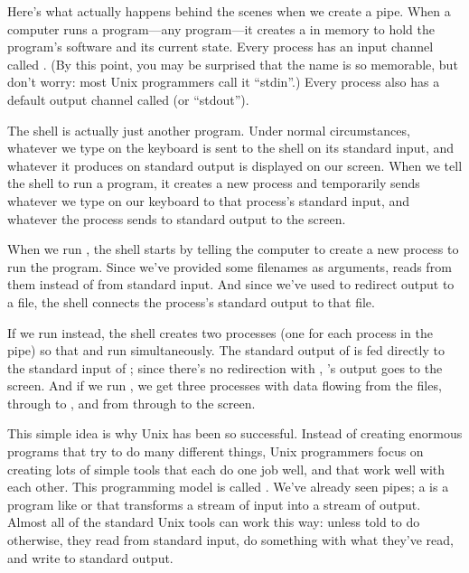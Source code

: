 Here's what actually happens behind the scenes when we create a pipe.
When a computer runs a program---any program---it creates a
 in memory to hold the program's software
and its current state. Every process has an input channel called
. (By this point, you may be
surprised that the name is so memorable, but don't worry: most Unix
programmers call it ``stdin''.) Every process also has a default output
channel called  (or
``stdout'').

The shell is actually just another program. Under normal circumstances,
whatever we type on the keyboard is sent to the shell on its standard
input, and whatever it produces on standard output is displayed on our
screen. When we tell the shell to run a program, it creates a new
process and temporarily sends whatever we type on our keyboard to that
process's standard input, and whatever the process sends to standard
output to the screen.

When we run
, the shell starts by telling
the computer to create a new process to run the  program.
Since we've provided some filenames as arguments,  reads
from them instead of from standard input. And since we've used
\code{\textgreater{}} to redirect output to a file, the shell connects
the process's standard output to that file.

If we run  instead, the shell
creates two processes (one for each process in the pipe) so that
 and  run simultaneously. The standard output of
 is fed directly to the standard input of ;
since there's no redirection with \code{\textgreater{}},
's output goes to the screen. And if we run
, we get three
processes with data flowing from the files, through  to
, and from  through  to the
screen.

This simple idea is why Unix has been so successful. Instead of creating
enormous programs that try to do many different things, Unix programmers
focus on creating lots of simple tools that each do one job well, and
that work well with each other. This programming model is called
. We've already seen
pipes; a  is a program like  or
 that transforms a stream of input into a stream of output.
Almost all of the standard Unix tools can work this way: unless told to
do otherwise, they read from standard input, do something with what
they've read, and write to standard output.

